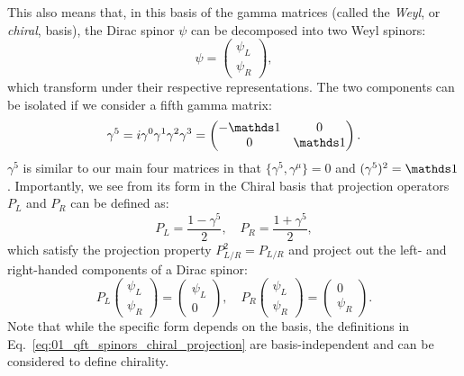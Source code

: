 This also means that, in this basis of the gamma matrices (called the \textit{Weyl}, or \textit{chiral}, basis), the Dirac spinor $\psi$ can be decomposed into two Weyl spinors:
\begin{equation}
	\label{eq:01_qft_spinors_spinor_decomposition}
	\psi = \begin{pmatrix} \psi_L \\ \psi_R \end{pmatrix},
\end{equation}
which transform under their respective representations.
The two components can be isolated if we consider a fifth gamma matrix:
\begin{equation}
	\label{eq:01_qft_spinors_gamma_five}
	\gamma^5 = i\gamma^0\gamma^1\gamma^2\gamma^3 = \begin{pmatrix} -\identity & 0 \\ 0 & \identity \end{pmatrix}.
\end{equation}
$\gamma^5$ is similar to our main four matrices in that $\{\gamma^5, \gamma^\mu\} = 0$ and $(\gamma^5)^2 = \identity$.
Importantly, we see from its form in the Chiral basis that projection operators $P_L$ and $P_R$ can be defined as:
\begin{equation}
	\label{eq:01_qft_spinors_chiral_projection}
	P_L = \frac{1 - \gamma^5}{2}, \quad P_R = \frac{1 + \gamma^5}{2},
\end{equation}
which satisfy the projection property $P_{L/R}^2 = P_{L/R}$ and project out the left- and right-handed components of a Dirac spinor:
\begin{equation}
	\label{eq:01_qft_spinors_chiral_projection_action}
	P_{L} \begin{pmatrix} \psi_L \\ \psi_R \end{pmatrix} = \begin{pmatrix} \psi_L \\ 0 \end{pmatrix}, \quad P_{R} \begin{pmatrix} \psi_L \\ \psi_R \end{pmatrix} = \begin{pmatrix} 0 \\ \psi_R \end{pmatrix}.
\end{equation}
Note that while the specific form depends on the basis, the definitions in Eq.~\ref{eq:01_qft_spinors_chiral_projection} are basis-independent and can be considered to define chirality.

